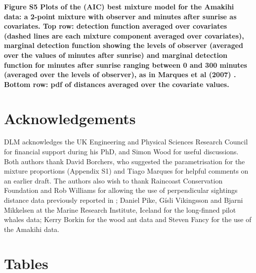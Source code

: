 \documentclass[10pt]{article}
\begin{document}
\textbf{Figure S5 Plots of the (AIC) best mixture model for the Amakihi data: a 2-point mixture with observer and minutes after sunrise as covariates. Top row: detection function averaged over covariates (dashed lines are each mixture component averaged over covariates), marginal detection function showing the levels of observer (averaged over the values of minutes after sunrise) and marginal detection function for minutes after sunrise ranging between 0 and 300 minutes (averaged over the levels of observer), as in Marques et al (2007) \cite{Marques:2007vm}. Bottom row: pdf of distances averaged over the covariate values.}


\section*{Acknowledgements}

DLM acknowledges the UK Engineering and Physical Sciences Research Council for financial support during his PhD, and Simon Wood for useful discussions.  Both authors thank David Borchers, who suggested the parametrisation for the mixture proportions (Appendix S1) and Tiago Marques for helpful comments on an earlier draft. The authors also wish to thank Raincoast Conservation Foundation and Rob Williams for allowing the use of perpendicular sightings distance data previously reported in \cite{Williams:2007tc}; Daniel Pike, G\'{i}sli Vikingsson and Bjarni Mikkelsen at the Marine Research Institute, Iceland for the long-finned pilot whales data; Kerry Borkin for the wood ant data and Steven Fancy for the use of the Amakihi data.



\section*{Tables}
\end{document}

